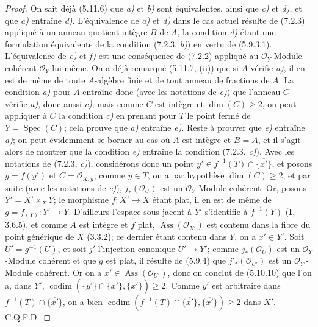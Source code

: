 \begin{proof}
On sait déjà (5.11.6) que \emph{a)} et \emph{b)} sont équivalentes, ainsi que \emph{c)} et \emph{d)},
et que \emph{a)} entraîne \emph{d)}. L'équivalence de \emph{a)} et \emph{d)} dans le cas actuel résulte
de (7.2.3) appliqué à un anneau quotient intègre $B$ de $A$, la condition
\emph{d)} étant une formulation équivalente de la condition (7.2.3, \emph{b)}) en vertu
de (5.9.3.1). L'équivalence de \emph{e)} et \emph{f)} est une conséquence de (7.2.2)
appliqué au $\mathscr O_Y$-Module cohérent $\mathscr O_Y$ lui-même. On a
déjà remarqué (5.11.7, (ii)) que si $A$ vérifie \emph{a)}, il en est de même de
toute $A$-algèbre finie et de tout anneau de fractions de $A$. La condition
\emph{a)} pour $A$ entraîne donc (avec les notations de \emph{e)}) que l'anneau $C$
vérifie \emph{a)}, donc aussi \emph{c)}; mais comme $C$ est intègre et $\dim(C)\geqslant
2$, on peut appliquer à $C$ la condition \emph{c)} en prenant pour $T$ le point
fermé de $Y=\operatorname{Spec}(C)$; cela prouve que \emph{a)} entraîne \emph{e)}. Reste
à prouver que \emph{e)} entraîne \emph{a)}; on peut évidemment se borner au cas où $A$
est intègre et $B=A$, et il s'agit alors de montrer que la condition \emph{e)}
entraîne la condition (7.2.3, \emph{c)}). Avec les notations de (7.2.3, \emph{c)}),
considérons donc un point
$y'\in f^{-1}(T)\cap\overline{\{x'\}}$, et posons $y=f(y')$ et
$C=\mathscr O_{X,y}$; comme $y\in T$, on a par hypothèse
$\dim(C)\geqslant2$, et par suite (avec les notations de \emph{e)}),
$j_*(\mathscr O_U)$ est un $\mathscr O_Y$-Module cohérent. Or, posons
$Y'=X'\times_XY$; le morphisme $f:X'\to X$ étant plat, il en est de même de
$g=f_{(Y)}:Y'\to Y$. D'ailleurs l'espace sous-jacent à $Y'$ s'identifie à
$f^{-1}(Y)$ (\textbf{I}, 3.6.5), et comme $A$ est intègre et $f$ plat,
$\operatorname{Ass}(\mathscr O_{X'})$ est contenu dans la fibre du point
générique de $X$ (3.3.2); ce dernier étant contenu dans $Y$, on a
$x'\in Y'$. Soit $U'=g^{-1}(U)$, et soit $j'$ l'injection canonique
$U'\to Y'$; comme $j_*(\mathscr O_U)$ est un $\mathscr O_Y$-Module
cohérent et que $g$ est plat, il résulte de (5.9.4) que
$j'_*(\mathscr O_{U'})$ est un $\mathscr O_{Y'}$-Module cohérent. Or on a
$x'\in\operatorname{Ass}(\mathscr O_{U'})$, donc on conclut de (5.10.10)
que l'on a, dans $Y'$,
$\operatorname{codim}(\overline{\{y'\}}\cap\overline{\{x'\}},
\overline{\{x'\}})\geqslant2$.
Comme $y'$ est arbitraire dans
$f^{-1}(T)\cap\overline{\{x'\}}$, on a bien
$\operatorname{codim}(f^{-1}(T)\cap\overline{\{x'\}},
\overline{\{x'\}})\geqslant2$ dans $X'$. C.Q.F.D.
\end{proof}

